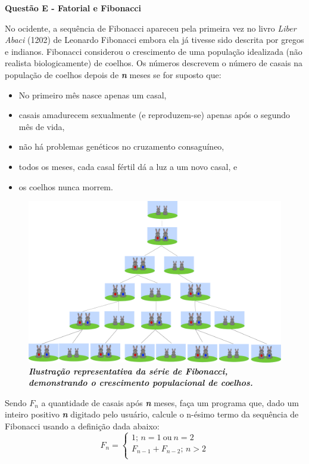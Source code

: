 \documentclass[a4paper, 12pt]{article}
\begin{document}
\newpage %
\begin{center}
\textbf{{\Large Questão E - Fatorial e Fibonacci}}
\end{center}
\vspace{5pt}
No ocidente, a sequência de Fibonacci apareceu pela primeira vez no livro \textit{Liber Abaci} (1202) de Leonardo Fibonacci embora ela já tivesse sido descrita por gregos e indianos. Fibonacci considerou o crescimento de uma população idealizada (não realista biologicamente) de coelhos. Os números descrevem o número de casais na população de coelhos depois de \textbf{\textit{n}} meses se for suposto que:
\begin{itemize}
	\item No primeiro mês nasce apenas um casal,
	\item casais amadurecem sexualmente (e reproduzem-se) apenas após o segundo mês de vida,
	\item não há problemas genéticos no cruzamento consaguíneo,
	\item todos os meses, cada casal fértil dá a luz a um novo casal, e
	\item os coelhos nunca morrem.
\end{itemize}
\begin{figure}[H]
	\centering
	\includegraphics[scale=0.5]{Fibonacci.png}
	\caption{\textbf{\textit{Ilustração representativa da série de Fibonacci, demonstrando o crescimento populacional de coelhos.}}}
\end{figure}
Sendo $F_n$ a quantidade de casais após \textbf{\textit{n}} meses, faça um programa que, dado um inteiro positivo \textbf{\textit{n}} digitado pelo usuário, calcule o n-ésimo termo da sequência de Fibonacci usando a definição dada abaixo: 
$$F_n =
		\begin{cases}
			1;\, n = 1\ \textrm{ou}\ n = 2 \\
			F_{n-1} + F_{n-2};\, n > 2 \\
		\end{cases}
$$
\end{document}
